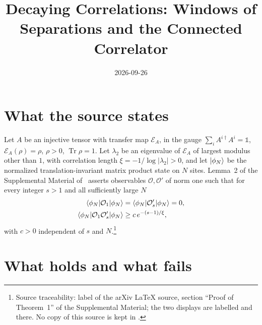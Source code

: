 \documentclass{article}
\title{Decaying Correlations: Windows of Separations and the Connected Correlator}
\author{}
\date{2026-09-26}
\begin{document}
\maketitle
{}

\section{What the source states}
Let $A$ be an injective tensor with transfer map $\mathcal E_A$, in the gauge
$\sum_i A^{i\dagger}A^i=\mathbb 1$, $\mathcal E_A(\rho)=\rho$, $\rho>0$,
$\operatorname{Tr}\rho=1$. Let $\lambda_2$ be an eigenvalue of $\mathcal E_A$
of largest modulus other than $1$, with correlation length
$\xi=-1/\log\lvert\lambda_2\rvert>0$, and let $|\phi_N\rangle$ be the normalized
translation-invariant matrix product state on $N$ sites. Lemma~2 of the
Supplemental Material of~\cite{Malz2024Preparation} asserts observables
$\mathcal O,\mathcal O'$ of norm one such that for every integer $s>1$ and all
sufficiently large $N$
\begin{align}
    \langle \phi_N|\mathcal O_1|\phi_N\rangle
     & =\langle \phi_N|\mathcal O'_s|\phi_N\rangle=0,
    \label{eq:mswc24_decaying_correlations_one_point} \\
    \langle \phi_N|\mathcal O_1\mathcal O'_s|\phi_N\rangle
     & \ge c\,e^{-(s-1)/\xi},
    \label{eq:mswc24_decaying_correlations_printed_bound}
\end{align}
with $c>0$ independent of $s$ and $N$.\footnote{Source traceability: label
     of the arXiv LaTeX source, section ``Proof of Theorem~1'' of
    the Supplemental Material; the two displays are labelled 
    and  there. No copy of this source is kept in
    .}

\section{What holds and what fails}
\end{document}
